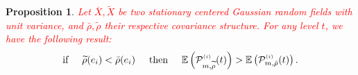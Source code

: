 \documentclass[12pt]{article}
\renewcommand{\tilde}{\widetilde}
\theoremstyle{Theorem}
\newtheorem{Proposition}[Theorem]{Proposition}
\theoremstyle{definition}
\begin{document}
\begin{Proposition}
\label{powertest}
\textcolor{red}{Let $\overline{X}, \tilde{X}$ be two stationary centered Gaussian random fields with unit variance, and $\bar{\rho}, \tilde{\rho}$ their respective covariance structure. For any level $t$, we  have the following result:}
\begin{equation*}
 \text{if} \hspace{0.5cm} \tilde{\rho}(e_i) < \bar{\rho}(e_i) \hspace{0.5cm} \text{then} \hspace{0.5cm}\mathbb{E}\left(\mathcal{P}^{\scriptscriptstyle (i)}_{m, \tilde{\rho}}(t)\right) > \mathbb{E}\left(\mathcal{P}^{\scriptscriptstyle (i)}_{m, \bar{\rho}}(t)\right).
\end{equation*}
\end{Proposition}
\end{document}
